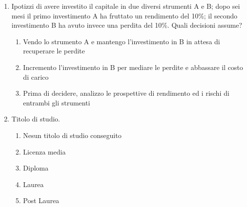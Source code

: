 \begin{itemize}
\begin{enumerate}
\begin{enumerate}[label*=\arabic*]
            \item Ipotizzi di avere investito il capitale in due diversi strumenti A e B; dopo sei mesi il primo investimento A ha fruttato un rendimento del 10\%; il secondo investimento B ha avuto invece una perdita del 10\%. Quali decisioni assume?
            \begin{enumerate}
                \item Vendo lo strumento A e mantengo l’investimento in B in attesa di recuperare le perdite
                \item Incremento l’investimento in B per mediare le perdite e abbassare il costo di carico
                \item Prima di decidere, analizzo le prospettive di rendimento ed i rischi di entrambi gli strumenti 
            \end{enumerate}

            \item Titolo di studio.
            \begin{enumerate}
                \item Nesun titolo di studio conseguito
                \item Licenza media
                \item Diploma
                \item Laurea
                \item Post Laurea
            \end{enumerate}
        \end{enumerate}
    \end{enumerate}

\end{itemize}